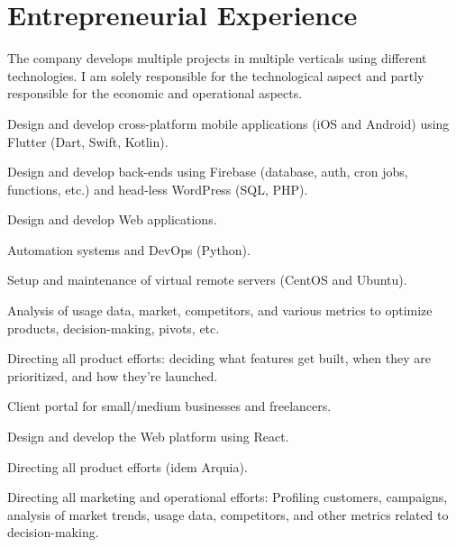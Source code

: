 \documentclass[]{robertino-cv}
\begin{document}
\begin{minipage}[t]{0.50\textwidth} 


\section{Entrepreneurial Experience}

The company develops multiple projects in multiple verticals using different technologies. I am solely responsible for the technological aspect and partly responsible for the economic and operational aspects.
\begin{tightemize}
\item Design and develop cross-platform mobile applications (iOS and Android) using Flutter (Dart, Swift, Kotlin).
\item Design and develop back-ends using Firebase (database, auth, cron jobs, functions, etc.) and head-less WordPress (SQL, PHP). 
\item Design and develop Web applications.
\item Automation systems and DevOps (Python).
\item Setup and maintenance of virtual remote servers (CentOS and Ubuntu).
\item Analysis of usage data, market, competitors, and various metrics to optimize products, decision-making, pivots, etc.
\item Directing all product efforts: deciding what features get built, when they are prioritized, and how they're launched.
\end{tightemize}
\sectionsep


Client portal for small/medium businesses and freelancers.
\begin{tightemize}
\item Design and develop the Web platform using React.
\item Directing all product efforts (idem Arquia).
\item Directing all marketing and operational efforts: Profiling customers, campaigns, analysis of market trends, usage data, competitors, and other metrics related to decision-making.
\end{tightemize}
\sectionsep



\end{minipage}
\end{document}
